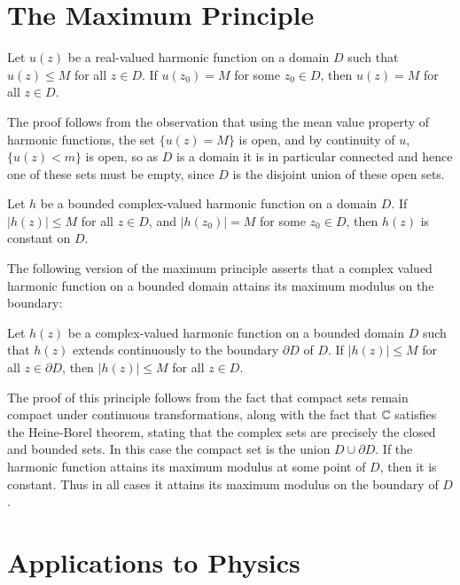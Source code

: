 \documentclass[12pt, a4paper, oneside, openright, titlepage]{book}
\begin{document}
\section{The Maximum Principle}


\begin{namthm}
    Let $u(z)$ be a real-valued harmonic function on a domain $D$ such that $u(z) \leq M$ for all $z \in D$. If $u(z_0) = M$ for some $z_0 \in D$, then $u(z) = M$ for all $z \in D$.
\end{namthm}

The proof follows from the observation that using the mean value property of harmonic functions, the set $\{u(z) = M\}$ is open, and by continuity of $u$, $\{u(z) < m\}$ is open, so as $D$ is a domain it is in particular connected and hence one of these sets must be empty, since $D$ is the disjoint union of these open sets.


\begin{namthm}
    Let $h$ be a bounded complex-valued harmonic function on a domain $D$. If $|h(z)| \leq M$ for all $z \in D$, and $|h(z_0)| = M$ for some $z_0 \in D$, then $h(z)$ is constant on $D$.
\end{namthm}

The following version of the maximum principle asserts that a complex valued harmonic function on a bounded domain attains its maximum modulus on the boundary:

\begin{namthm}
    Let $h(z)$ be a complex-valued harmonic function on a bounded domain $D$ such that $h(z)$ extends continuously to the boundary $\partial D$ of $D$. If $|h(z)|\leq M$ for all $z \in \partial D$, then $|h(z)|\leq M$ for all $z \in D$.
\end{namthm}

The proof of this principle follows from the fact that compact sets remain compact under continuous transformations, along with the fact that $\mathbb C$ satisfies the Heine-Borel theorem, stating that the complex sets are precisely the closed and bounded sets. In this case the compact set is the union $D\cup \partial D$. If the harmonic function attains its maximum modulus at some point of $D$, then it is constant. Thus in all cases it attains its maximum modulus on the boundary of $D$.




\section{Applications to Physics}
\end{document}
